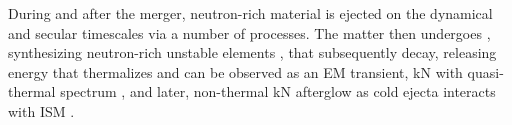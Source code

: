 During and after the merger, neutron-rich material is ejected on the 
dynamical \citep{Rosswog:1998hy,Hotokezaka:2013b,Bauswein:2013yna,Wanajo:2014wha,Radice:2018pdn} 
and secular \citep{Lee:2009,Perego:2014fma,Fernandez:2015use,Siegel:2017nub,Fujibayashi:2017puw,Fernandez:2018kax,Miller:2019dpt} 
timescales via a number of processes. %
The matter then 
undergoes \rproc{} \nuc{}, synthesizing neutron-rich unstable elements 
\citep{Eichler:1989ve,Wanajo:2014wha,Cowan:2019pkx},
that subsequently decay, releasing energy that thermalizes and can be observed as 
an \ac{EM} transient, \ac{kN} with quasi-thermal spectrum \citep{Metzger:2019zeh},
and later, non-thermal \ac{kN} afterglow as cold ejecta interacts with \ac{ISM} \citep{Piran:2012wd}.
%



